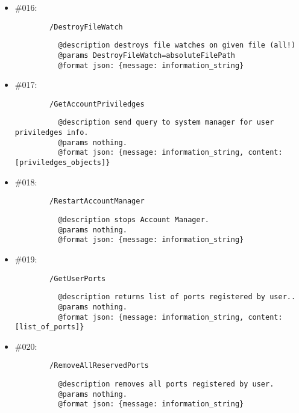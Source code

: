 \documentclass[11pt,a4paper]{scrartcl}
\begin{document}
\begin{description}
\begin{itemize}
        \item \#016:
          \begin{verbatim}
        /DestroyFileWatch
          \end{verbatim}
          \begin{verbatim}
          @description destroys file watches on given file (all!)
          @params DestroyFileWatch=absoluteFilePath
          @format json: {message: information_string}
          \end{verbatim}

        \item \#017:
          \begin{verbatim}
        /GetAccountPriviledges
          \end{verbatim}
          \begin{verbatim}
          @description send query to system manager for user priviledges info.
          @params nothing.
          @format json: {message: information_string, content: [priviledges_objects]}
          \end{verbatim}


        \item \#018:
          \begin{verbatim}
        /RestartAccountManager
          \end{verbatim}
          \begin{verbatim}
          @description stops Account Manager.
          @params nothing.
          @format json: {message: information_string}
          \end{verbatim}

        \item \#019:
          \begin{verbatim}
        /GetUserPorts
          \end{verbatim}
          \begin{verbatim}
          @description returns list of ports registered by user..
          @params nothing.
          @format json: {message: information_string, content: [list_of_ports]}
          \end{verbatim}

        \item \#020:
          \begin{verbatim}
        /RemoveAllReservedPorts
          \end{verbatim}
          \begin{verbatim}
          @description removes all ports registered by user.
          @params nothing.
          @format json: {message: information_string}
          \end{verbatim}


\end{itemize}
\end{description}
\end{document}
